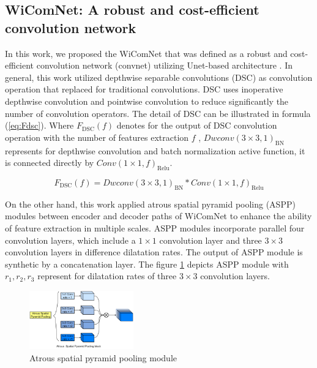 \documentclass[journal]{IEEEtran} %
\begin{document}
\subsection{WiComNet: A robust and cost-efficient convolution network}
In this work, we proposed the WiComNet that was defined as a robust and cost-efficient convolution network (convnet) utilizing Unet-based architecture \cite{ronneberger2015u}. In general, this work utilized depthwise separable convolutions (DSC) \cite{CholletXception} as convolution operation that replaced for traditional convolutions. DSC uses inoperative depthwise convolution and pointwise convolution to reduce significantly the number of convolution operators. The detail of DSC can be illustrated in formula (\ref{eq:Fdsc}). Where \(F_{\text{DSC}}(f)\) denotes for the output of DSC convolution operation with the number of features extraction \(f\) , \(Dwconv(3\times3,1)_{\text{BN}}\) represents for depthwise convolution and batch normalization active function, it is connected directly by \(Conv(1\times1,f)_{\text{Relu}}\).

\begin{equation}
    F_{\text{DSC}}(f) = Dwconv(3\times3,1)_{\text{BN}} * Conv(1\times1,f)_{\text{Relu}}
    \label{eq:Fdsc}
\end{equation}

\indent On the other hand, this work applied atrous spatial pyramid pooling (ASPP) modules \cite{ChenAtrous} between encoder and decoder paths of WiComNet to enhance the ability of feature extraction in multiple scales. ASPP modules incorporate parallel four convolution layers, which include a \(1\times1\) convolution layer and three \(3\times3\) convolution layers in difference dilatation rates. The output of ASPP module is synthetic by a concatenation layer. The figure \ref{fig3} depicts ASPP module with \(r_1, r_2, r_3\) represent for dilatation rates of three \(3\times3\) convolution layers. 

\begin{figure}[!ht]
    \centering
    \includegraphics[width=0.4\textwidth]{img/Design-ASPP.jpg}
    \caption{Atrous spatial pyramid pooling module}
    \label{fig3}
\end{figure}
\end{document}

